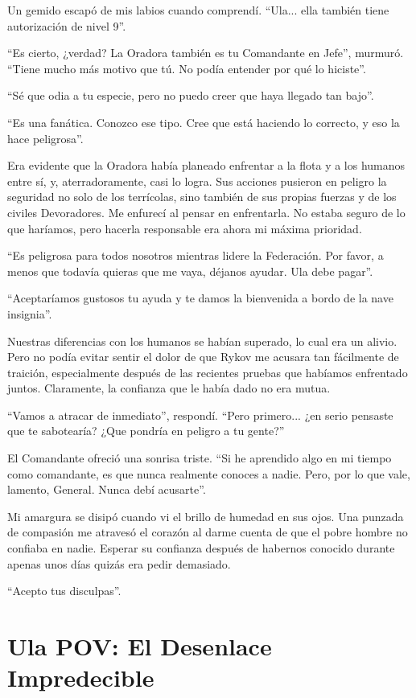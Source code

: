 \documentclass[spanish,12pt,a4paper,oneside,titlepage]{book}
\begin{document}
    Un gemido escapó de mis labios cuando comprendí. ``Ula... ella también tiene autorización de nivel 9''.

    ``Es cierto, ¿verdad? La Oradora también es tu Comandante en Jefe'', murmuró. ``Tiene mucho más motivo que tú. No podía entender por qué lo hiciste''.

    ``Sé que odia a tu especie, pero no puedo creer que haya llegado tan bajo''.

    ``Es una fanática. Conozco ese tipo. Cree que está haciendo lo correcto, y eso la hace peligrosa''.

    Era evidente que la Oradora había planeado enfrentar a la flota y a los humanos entre sí, y, aterradoramente, casi lo logra. Sus acciones pusieron en peligro la seguridad no solo de los terrícolas, sino también de sus propias fuerzas y de los civiles Devoradores. Me enfurecí al pensar en enfrentarla. No estaba seguro de lo que haríamos, pero hacerla responsable era ahora mi máxima prioridad.

    ``Es peligrosa para todos nosotros mientras lidere la Federación. Por favor, a menos que todavía quieras que me vaya, déjanos ayudar. Ula debe pagar''.

    ``Aceptaríamos gustosos tu ayuda y te damos la bienvenida a bordo de la nave insignia''.

    Nuestras diferencias con los humanos se habían superado, lo cual era un alivio. Pero no podía evitar sentir el dolor de que Rykov me acusara tan fácilmente de traición, especialmente después de las recientes pruebas que habíamos enfrentado juntos. Claramente, la confianza que le había dado no era mutua.

    ``Vamos a atracar de inmediato'', respondí. ``Pero primero... ¿en serio pensaste que te sabotearía? ¿Que pondría en peligro a tu gente?''

    El Comandante ofreció una sonrisa triste. ``Si he aprendido algo en mi tiempo como comandante, es que nunca realmente conoces a nadie. Pero, por lo que vale, lamento, General. Nunca debí acusarte''.

    Mi amargura se disipó cuando vi el brillo de humedad en sus ojos. Una punzada de compasión me atravesó el corazón al darme cuenta de que el pobre hombre no confiaba en nadie. Esperar su confianza después de habernos conocido durante apenas unos días quizás era pedir demasiado.

    ``Acepto tus disculpas''.

    \chapter{Ula POV: El Desenlace Impredecible}
\end{document}
